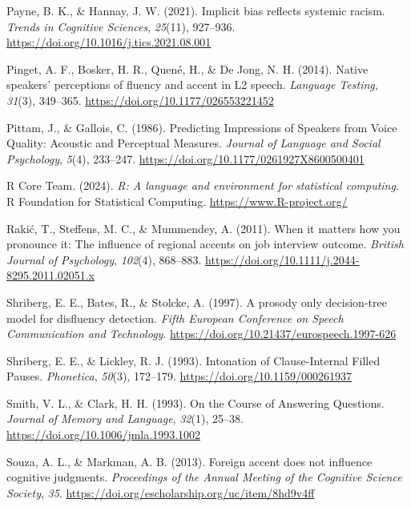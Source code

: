 \documentclass[
  man,floatsintext]{apa7}
\newlength{\cslhangindent}
\newlength{\cslentryspacingunit} %
\newenvironment{CSLReferences}[2] %
 {%
  \setlength{\parindent}{0pt}
  \ifodd #1
  \let\oldpar\par
  \def\par{\hangindent=\cslhangindent\oldpar}
  \fi
  \setlength{\parskip}{#2\cslentryspacingunit}
 }%
 {}
\begin{document}
\begin{CSLReferences}{1}{0}
\leavevmode{}%
Payne, B. K., \& Hannay, J. W. (2021). Implicit bias reflects systemic racism. \emph{Trends in Cognitive Sciences}, \emph{25}(11), 927--936. \url{https://doi.org/10.1016/j.tics.2021.08.001}

\leavevmode{}%
Pinget, A. F., Bosker, H. R., Quené, H., \& De Jong, N. H. (2014). Native speakers' perceptions of fluency and accent in {L2} speech. \emph{Language Testing}, \emph{31}(3), 349--365. \url{https://doi.org/10.1177/026553221452}

\leavevmode{}%
Pittam, J., \& Gallois, C. (1986). Predicting {I}mpressions of {S}peakers from {V}oice {Q}uality: {A}coustic and {P}erceptual {M}easures. \emph{Journal of Language and Social Psychology}, \emph{5}(4), 233--247. \url{https://doi.org/10.1177/0261927X8600500401}

\leavevmode{}%
R Core Team. (2024). \emph{R: A language and environment for statistical computing}. R Foundation for Statistical Computing. \url{https://www.R-project.org/}

\leavevmode{}%
Rakić, T., Steffens, M. C., \& Mummendey, A. (2011). When it matters how you pronounce it: The influence of regional accents on job interview outcome. \emph{British Journal of Psychology}, \emph{102}(4), 868--883. \url{https://doi.org/10.1111/j.2044-8295.2011.02051.x}

\leavevmode{}%
Shriberg, E. E., Bates, R., \& Stolcke, A. (1997). A prosody only decision-tree model for disfluency detection. \emph{Fifth European Conference on Speech Communication and Technology}. \url{https://doi.org/10.21437/eurospeech.1997-626}

\leavevmode{}%
Shriberg, E. E., \& Lickley, R. J. (1993). Intonation of {C}lause-{I}nternal {F}illed {P}auses. \emph{Phonetica}, \emph{50}(3), 172--179. \url{https://doi.org/10.1159/000261937}

\leavevmode{}%
Smith, V. L., \& Clark, H. H. (1993). On the {C}ourse of {A}nswering {Q}uestions. \emph{Journal of Memory and Language}, \emph{32}(1), 25--38. \url{https://doi.org/10.1006/jmla.1993.1002}

\leavevmode{}%
Souza, A. L., \& Markman, A. B. (2013). Foreign accent does not influence cognitive judgments. \emph{Proceedings of the Annual Meeting of the Cognitive Science Society}, \emph{35}. \url{https://doi.org/escholarship.org/uc/item/8hd9v4ff}


\end{CSLReferences}
\end{document}
